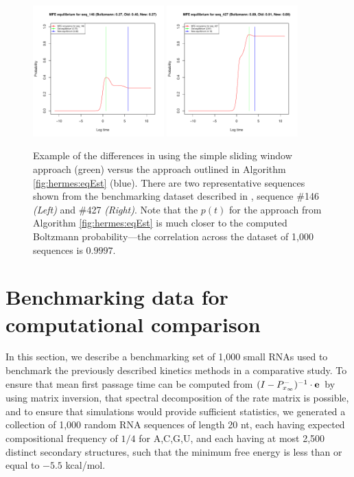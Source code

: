 \begin{figure}[!ht]
\centering
\includegraphics[width=0.45\textwidth]{Figures/Hermes/eqEstFromRnaEqSeq146.pdf}
\quad
\includegraphics[width=0.45\textwidth]{Figures/Hermes/eqEstFromRnaEqSeq427.pdf}
\caption{Example of the differences in using the simple sliding window
approach (green) versus the approach outlined in Algorithm \ref{fig:hermes:eqEst}
(blue). There are two representative sequences shown from the benchmarking
dataset described in , sequence \#146
{\em (Left)} and \#427 {\em (Right)}. Note that the $p(t)$ for the approach from
Algorithm \ref{fig:hermes:eqEst} is much closer to the computed Boltzmann
probability---the correlation across the dataset of 1,000 sequences is
$0.9997$.}
\label{fig:hermes:eqEstFromRnaEq}
\end{figure}

\section{Benchmarking data for computational comparison}
\label{sec:hermes:benchdata}

In this section, we describe a
benchmarking set of 1,000 small RNAs used to benchmark the previously
described kinetics methods in a comparative study. To ensure that mean
first passage time can be computed from
$(I - P^{-}_{x_\infty})^{-1} \cdot {\bf e}$ by using matrix
inversion, that spectral decomposition of the rate matrix is possible,
and to ensure that \kinfold simulations would provide sufficient
statistics, we generated a collection of 1,000 random RNA sequences of
length 20 nt, each having expected compositional frequency of $1/4$
for A,C,G,U, and each having at most 2,500 distinct secondary
structures, such that the minimum free energy is less than or equal to
$-5.5$ kcal/mol.

